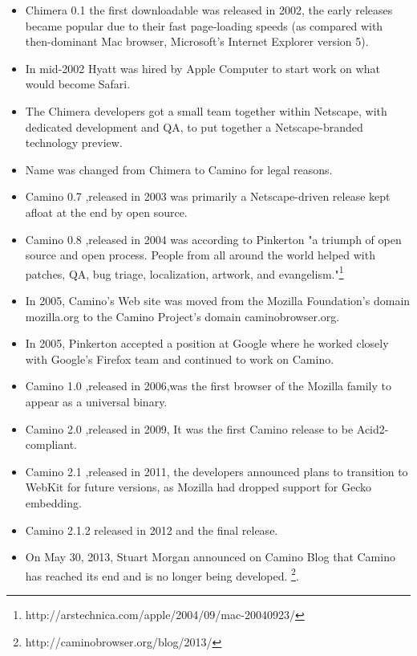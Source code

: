 \documentclass[11pt]{article} %
\begin{document}
  \begin{itemize}
  
 \item Chimera 0.1 the first downloadable was released in 2002, the early releases became popular due to their fast page-loading speeds (as compared with then-dominant Mac browser, Microsoft's Internet Explorer version 5).
 \item In mid-2002 Hyatt was hired by Apple Computer to start work on what would become Safari. 
 \item The Chimera developers got a small team together within Netscape, with dedicated development and QA, to put together a Netscape-branded technology preview.
 \item Name was changed from Chimera to Camino for legal reasons.
 \item Camino 0.7 ,released in 2003 was primarily a Netscape-driven release kept afloat at the end by open source.
  \item Camino 0.8 ,released in 2004 was according to Pinkerton "a triumph of open source and open process. People from all around the world helped with patches, QA, bug triage, localization, artwork, and evangelism."\footnote{http://arstechnica.com/apple/2004/09/mac-20040923/}\\
 \item In 2005, Camino's Web site was moved from the Mozilla Foundation's domain mozilla.org to the Camino Project's domain caminobrowser.org.
 \item In 2005, Pinkerton accepted a position at Google where he worked closely with Google's Firefox team and continued to work on Camino.
 \item Camino 1.0 ,released in 2006,was the first browser of the Mozilla family to appear as a universal binary.
 \item Camino 2.0 ,released in 2009, It was the first Camino release to be Acid2-compliant.
 \item Camino 2.1 ,released in 2011, the developers announced plans to transition to WebKit for future versions, as Mozilla had dropped support for Gecko embedding.
 \item Camino 2.1.2 released in 2012 and the final release.
\item On May 30, 2013, Stuart Morgan announced on Camino Blog that Camino has reached its end and is no longer being developed. \footnote{http://caminobrowser.org/blog/2013/}.
 \end{itemize}

\end{document}
